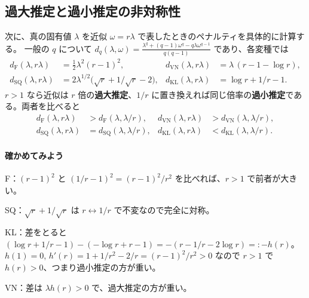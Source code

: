 \documentclass[a4paper,11pt]{ltjsarticle}
\theoremstyle{definition}
\theoremstyle{plain}
\begin{document}
\subsection{過大推定と過小推定の非対称性}

次に、真の固有値 $\lambda$ を近似 $\omega = r\lambda$ で表したときのペナルティを具体的に計算する。
一般の $q$ について $d_q(\lambda,\omega) = \frac{\lambda^q + (q-1)\omega^q - q\lambda\omega^{q-1}}{q(q-1)}$ であり、各変種では
\begin{align}
  d_{\mathrm F}(\lambda, r\lambda) &= \tfrac12\lambda^2(r-1)^2, &
  d_{\mathrm{VN}}(\lambda, r\lambda) &= \lambda\,(r - 1 - \log r),\\
  d_{\mathrm{SQ}}(\lambda, r\lambda) &= 2\lambda^{1/2}\bigl(\sqrt r + 1/\sqrt r - 2\bigr), &
  d_{\mathrm{KL}}(\lambda, r\lambda) &= \log r + 1/r - 1 .
\end{align}
$r>1$ なら近似は $r$ 倍の\textbf{過大推定}、$1/r$ に置き換えれば同じ倍率の\textbf{過小推定}である。両者を比べると
\begin{equation}\label{eq:asym}
\begin{aligned}
  d_{\mathrm F}(\lambda, r\lambda) &> d_{\mathrm F}(\lambda, \lambda/r), &
  d_{\mathrm{VN}}(\lambda, r\lambda) &> d_{\mathrm{VN}}(\lambda, \lambda/r),\\
  d_{\mathrm{SQ}}(\lambda, r\lambda) &= d_{\mathrm{SQ}}(\lambda, \lambda/r), &
  d_{\mathrm{KL}}(\lambda, r\lambda) &< d_{\mathrm{KL}}(\lambda, \lambda/r).
\end{aligned}
\end{equation}

\paragraph{確かめてみよう}
F：$(r-1)^2$ と $(1/r-1)^2 = (r-1)^2/r^2$ を比べれば、$r>1$ で前者が大きい。

SQ：$\sqrt r + 1/\sqrt r$ は $r\leftrightarrow1/r$ で不変なので完全に対称。

KL：差をとると $(\log r + 1/r - 1) - (-\log r + r - 1) = -(r - 1/r - 2\log r) =: -h(r)$。
$h(1) = 0$, $h'(r) = 1 + 1/r^2 - 2/r = (r-1)^2/r^2 > 0$ なので $r>1$ で $h(r)>0$、つまり過小推定の方が重い。

VN：差は $\lambda h(r) > 0$ で、過大推定の方が重い。
\end{document}
